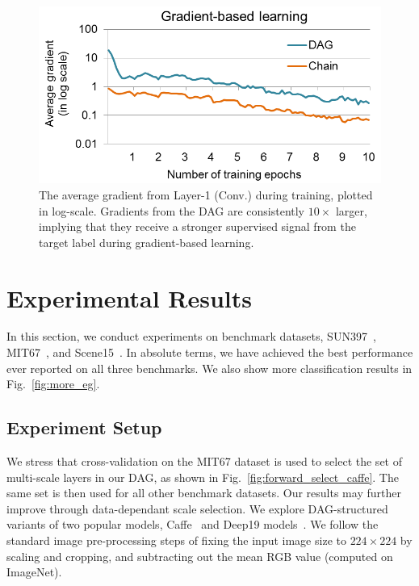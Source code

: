 \documentclass[10pt,twocolumn,letterpaper]{article}
\begin{document}
\begin{figure}[htbp]
\centering
\includegraphics[width=.9\columnwidth]{fig/fig_grad.png}
\caption{The average gradient from Layer-1 (Conv.) during training, plotted in log-scale. Gradients from the DAG are consistently $10\times$ larger, implying that they receive a stronger supervised signal from the target label during gradient-based learning.}
\label{fig:grad}
\end{figure}


\section{Experimental Results\label{sec:exp}}

In this section, we conduct experiments on benchmark datasets, SUN397~\cite{SUN397}, MIT67~\cite{MIT67}, and Scene15~\cite{Scene15}. In absolute terms, we have achieved the best performance ever reported on all three benchmarks. We also show more classification results in Fig.~\ref{fig:more_eg}. 

\subsection{Experiment Setup}
We stress that cross-validation on the MIT67 dataset is used to select the set of multi-scale layers in our DAG, as shown in Fig.~\ref{fig:forward_select_caffe}. The same set is then used for all other benchmark datasets. Our results may further improve through data-dependant scale selection. We explore DAG-structured variants of two popular models, Caffe~\cite{Caffe} and Deep19 models~\cite{veryDeep}. We follow the standard image pre-processing steps of fixing the input image size to $224\times 224$ by scaling and cropping, and subtracting out the mean RGB value (computed on ImageNet). 
\end{document}
